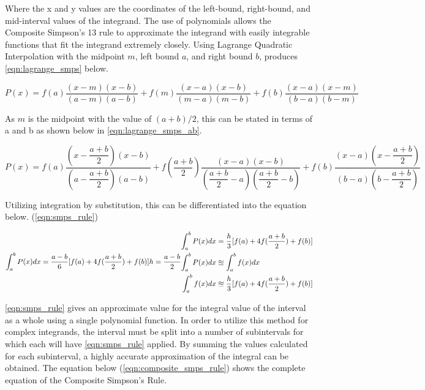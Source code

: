 \documentclass{paper}
\begin{document}
Where the x and y values are the coordinates of the left-bound, right-bound, and mid-interval values of the integrand.
The use of polynomials allows the Composite Simpson's 13 rule to approximate the integrand with easily integrable functions that fit the integrand extremely closely.
Using Lagrange Quadratic Interpolation with the midpoint \(m\), left bound \(a\), and right bound \(b\), produces \ref{eqn:lagrange_smps} below.

\begin{equation}
    \label{eqn:lagrange_smps}
    P(x) = f(a) \dfrac{(x - m)(x - b)}{(a - m)(a - b)} + f(m) \dfrac{(x - a)(x - b)}{(m - a)(m - b)} + f(b) \dfrac{(x - a)(x - m)}{(b - a)(b - m)}
\end{equation}

As \(m\) is the midpoint with the value of \((a + b) / 2\), this can be stated in terms of a and b as shown below in \ref{eqn:lagrange_smps_ab}.

\begin{equation}
    \label{eqn:lagrange_smps_ab}
    P(x) = f(a) \dfrac{(x - \dfrac{a+b}{2})(x - b)}{(a - \dfrac{a+b}{2})(a - b)} + f(\dfrac{a+b}{2}) \dfrac{(x - a)(x - b)}{(\dfrac{a+b}{2} - a)(\dfrac{a+b}{2} - b)} + f(b) \dfrac{(x - a)(x - \dfrac{a+b}{2})}{(b - a)(b - \dfrac{a+b}{2})}
\end{equation}

Utilizing integration by substitution, this can be differentiated into the equation below. (\ref{eqn:smps_rule})

\begin{equation}
    \label{eqn:smps_rule}
    \int_a^b P(x) dx = \dfrac{a - b}{6} [f(a) + 4f(\dfrac{a + b}{2}) + f(b)] \\
    h = \dfrac{a - b}{2} \\
    \begin{split}
        \int_a^b P(x) dx &= \dfrac{h}{3} [f(a) + 4f(\dfrac{a + b}{2}) + f(b)]   \\
        \int_a^b P(x) dx &\approxeq \int_a^b f(x) dx                            \\
        \int_a^b f(x) dx &\approxeq \dfrac{h}{3} [f(a) + 4f(\dfrac{a + b}{2}) + f(b)]   \\
    \end{split}
\end{equation}

\ref{eqn:smps_rule} gives an approximate value for the integral value of the interval as a whole using a single polynomial function.
In order to utilize this method for complex integrands, the interval must be split into a number of subintervals for which each will have \ref{eqn:smps_rule} applied.
By summing the values calculated for each subinterval, a highly accurate approximation of the integral can be obtained.
The equation below (\ref{eqn:composite_smps_rule}) shows the complete equation of the Composite Simpson's Rule.
\end{document}
